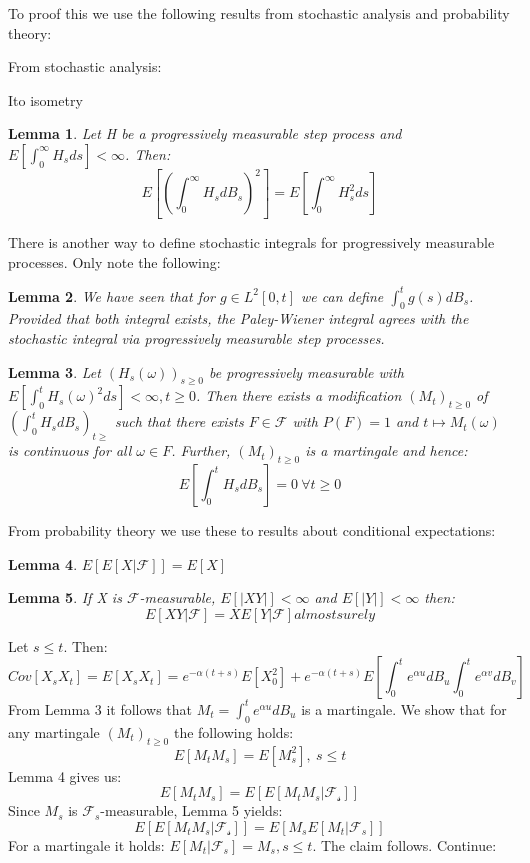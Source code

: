 \documentclass[%
thesis=student,%
coverpage=false,%
titlepage=false,%
headmarks=true, %
german,%
font=libertine, %
math=newpxtx, %
BCOR=5mm,%
coverBCOR=11mm%
]{tumbook}
\newtheorem{lemma}{Lemma}
\begin{document}
To proof this we use the following results from stochastic analysis and probability theory:

From stochastic analysis:

Ito isometry

\begin{lemma}
 Let H be a progressively measurable step process and $E[\int_{0}^{\infty}H_{s}ds]<\infty$. Then:
 \[
 E[(\int_{0}^{\infty}H_{s}dB_{s})^{2}] = E[\int_{0}^{\infty}H_{s}^{2}ds]
 \]
\end{lemma}

There is another way to define stochastic integrals for progressively measurable processes. Only note the following: 

\begin{lemma}
    We have seen that for $g \in L^{2}[0,t]$ we can define $\int_{0}^{t}g(s)dB_{s}$. Provided that both integral exists, the Paley-Wiener integral agrees with the stochastic integral via progressively measurable step processes.
\end{lemma}


\begin{lemma}
    Let $(H_{s}(\omega))_{s\geq 0}$ be progressively measurable with $E[\int_{0}^{t} H_{s}(\omega)^{2}ds] < \infty, t \geq 0$. Then there exists a modification $(M_{t})_{t\geq 0}$ of $(\int_{0}^{t}H_{s}dB_{s})_{t\geq}$ such that there exists $F \in \mathcal{F}$ with $P(F) = 1$ and $t \mapsto M_{t}(\omega)$ is continuous for all $\omega \in F$. Further, $(M_{t})_{t\geq 0}$ is a martingale and hence:
    \[
    E[\int_{0}^{t}H_{s}dB_{s}] = 0 \ \forall t \geq 0
    \]
\end{lemma}

From probability theory we use these to results about conditional expectations:

\begin{lemma}
    $E[E[X|\mathcal{F}]] = E[X]$
\end{lemma}

\begin{lemma}
    If X is $\mathcal{F}$-measurable, $E[\lvert XY \rvert] < \infty$ and $E[\lvert Y \rvert]< \infty$ then:
    \[
    E[XY|\mathcal{F}] = XE[Y|\mathcal{F}]  almost surely
    \]
\end{lemma}

Let $s \leq t$. Then:
\[
Cov[X_{s}X_{t}]=E[X_{s}X_{t}] = e^{-\alpha(t+s)}E[X_{0}^{2}] + e^{-\alpha(t+s)}E[\int_{0}^{t}e^{\alpha u}dB_{u}\int_{0}^{t}e^{\alpha v}dB_{v}]
\]
From Lemma 3 it follows that $M_{t} = \int_{0}^{t}e^{\alpha u}dB_{u}$ is a martingale. We show that for any martingale $(M_{t})_{t \geq 0}$ the following holds: 
\[
E[M_{t}M_{s}] = E[M_{s}^{2}], \ s \leq t
\]
Lemma 4 gives us:
\[
E[M_{t}M_{s}] = E[E[M_{t}M_{s}|\mathcal{F_{s}}]]
\]
Since $M_{s}$ is $\mathcal{F}_{s}$-measurable, Lemma 5 yields:
\[
E[E[M_{t}M_{s}|\mathcal{F_{s}}]] = E[M_{s}E[M_{t}|\mathcal{F}_{s}]]
\]
For a martingale it holds: $E[M_{t}|\mathcal{F}_{s}] = M_{s}, s \leq t$. The claim follows. Continue:
\end{document}
